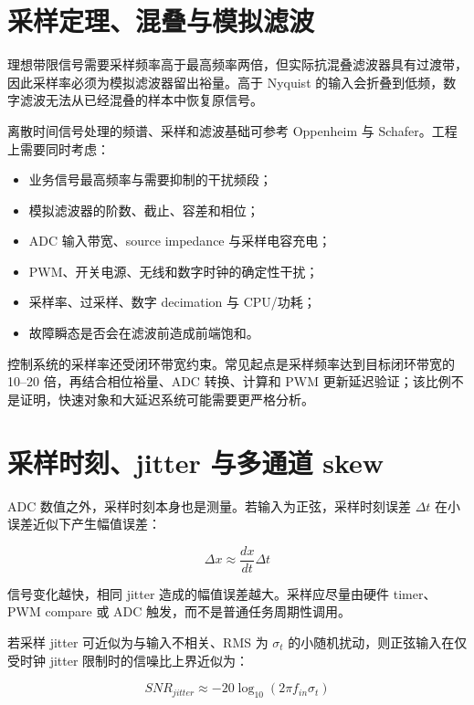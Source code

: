 \section{采样定理、混叠与模拟滤波}

理想带限信号需要采样频率高于最高频率两倍，但实际抗混叠滤波器具有过渡带，因此采样率必须为模拟滤波器留出裕量。高于 Nyquist 的输入会折叠到低频，数字滤波无法从已经混叠的样本中恢复原信号。

离散时间信号处理的频谱、采样和滤波基础可参考 Oppenheim 与 Schafer\cite{oppenheim-schafer-dsp}。工程上需要同时考虑：

\begin{itemize}
  \item 业务信号最高频率与需要抑制的干扰频段；
  \item 模拟滤波器的阶数、截止、容差和相位；
  \item ADC 输入带宽、source impedance 与采样电容充电；
  \item PWM、开关电源、无线和数字时钟的确定性干扰；
  \item 采样率、过采样、数字 decimation 与 CPU/功耗；
  \item 故障瞬态是否会在滤波前造成前端饱和。
\end{itemize}

控制系统的采样率还受闭环带宽约束。常见起点是采样频率达到目标闭环带宽的 10--20 倍，再结合相位裕量、ADC 转换、计算和 PWM 更新延迟验证；该比例不是证明，快速对象和大延迟系统可能需要更严格分析。

\section{采样时刻、jitter 与多通道 skew}

ADC 数值之外，采样时刻本身也是测量。若输入为正弦，采样时刻误差 $\Delta t$ 在小误差近似下产生幅值误差：

\begin{equation}
  \Delta x \approx \frac{dx}{dt}\Delta t
\end{equation}

信号变化越快，相同 jitter 造成的幅值误差越大。采样应尽量由硬件 timer、PWM compare 或 ADC 触发，而不是普通任务周期性调用。

若采样 jitter 可近似为与输入不相关、RMS 为 $\sigma_t$ 的小随机扰动，则正弦输入在仅受时钟 jitter 限制时的信噪比上界近似为：

\begin{equation}
  SNR_{jitter}\approx -20\log_{10}(2\pi f_{in}\sigma_t)
\end{equation}

